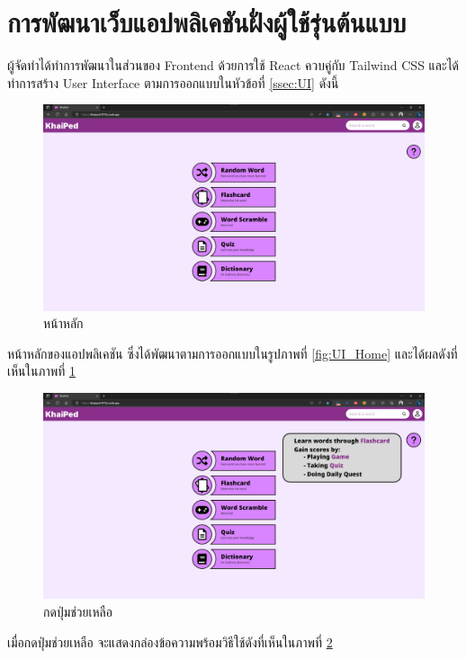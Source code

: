 \documentclass[12pt,oneside,openright,a4paper]{cpe-thai-project}
\begin{document}
\pagebreak
\section{การพัฒนาเว็บแอปพลิเคชันฝั่งผู้ใช้รุ่นต้นแบบ}
\hspace{1cm}
ผู้จัดทำได้ทำการพัฒนาในส่วนของ Frontend ด้วยการใช้ React ควบคู่กับ Tailwind CSS และได้ทำการสร้าง User Interface
ตามการออกแบบในหัวข้อที่ \ref{ssec:UI} ดังนี้

\begin{figure}[!h]\centering
	\includegraphics[width=\textwidth, keepaspectratio=true]{image/chap4/UI/home/home.png}
	\caption{{หน้าหลัก}}\label{fig:chap4UIHome}
\end{figure}
\hspace{1cm}
หน้าหลักของแอปพลิเคชัน ซึ่งได้พัฒนาตามการออกแบบในรูปภาพที่ \ref{fig:UI_Home} และได้ผลดังที่เห็นในภาพที่ \ref{fig:chap4UIHome}

\begin{figure}[!h]\centering
	\includegraphics[width=\textwidth, keepaspectratio=true]{image/chap4/UI/home/home help.png}
	\caption{{กดปุ่มช่วยเหลือ}}\label{fig:chap4UIHomeHelp}
\end{figure}
\hspace{1cm}
เมื่อกดปุ่มช่วยเหลือ จะแสดงกล่องข้อความพร้อมวิธีใช้ดังที่เห็นในภาพที่ \ref{fig:chap4UIHomeHelp}
\end{document}
